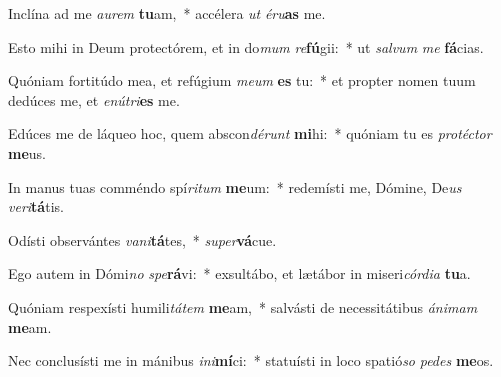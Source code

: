 \item Inclína ad me \textit{au}\textit{rem} \textbf{tu}am,~* accélera \textit{ut} \textit{é}\textit{ru}\textbf{as} me.
\item Esto mihi in Deum protectórem, et in do\textit{mum} \textit{re}\textbf{fú}gii:~* ut \textit{sal}\textit{vum} \textit{me} \textbf{fá}cias.
\item Quóniam fortitúdo mea, et refúgium \textit{me}\textit{um} \textbf{es} tu:~* et propter nomen tuum dedúces me, et \textit{e}\textit{nú}\textit{tri}\textbf{es} me.
\item Edúces me de láqueo hoc, quem abscon\textit{dé}\textit{runt} \textbf{mi}hi:~* quóniam tu es \textit{pro}\textit{téc}\textit{tor} \textbf{me}us.
\item In manus tuas comméndo spí\textit{ri}\textit{tum} \textbf{me}um:~* redemísti me, Dómine, De\textit{us} \textit{ve}\textit{ri}\textbf{tá}tis.
\item Odísti observántes \textit{va}\textit{ni}\textbf{tá}tes,~* \textit{su}\textit{per}\textbf{vá}cue.
\item Ego autem in Dómi\textit{no} \textit{spe}\textbf{rá}vi:~* exsultábo, et lætábor in miseri\textit{cór}\textit{di}\textit{a} \textbf{tu}a.
\item Quóniam respexísti humili\textit{tá}\textit{tem} \textbf{me}am,~* salvásti de necessitátibus \textit{á}\textit{ni}\textit{mam} \textbf{me}am.
\item Nec conclusísti me in mánibus \textit{in}\textit{i}\textbf{mí}ci:~* statuísti in loco spatió\textit{so} \textit{pe}\textit{des} \textbf{me}os.
